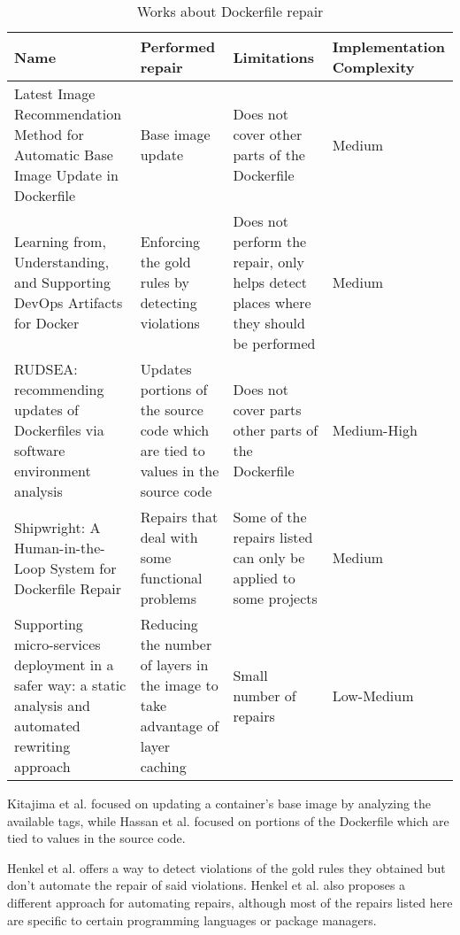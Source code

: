 \begin{table}[H]
    \centering
    \begin{tabular}{|p{}|p{}|p{}|p{}|}
        \hline \textbf{Name} & \textbf{Performed repair} & \textbf{Limitations} & \textbf{Implementation Complexity} \\
        \hline Latest Image Recommendation Method for Automatic Base Image Update in Dockerfile \cite{kitajimaLatestImageRecommendation2020} & Base image update & Does not cover other parts of the Dockerfile & Medium \\
        \hline Learning from, Understanding, and Supporting DevOps Artifacts for Docker \cite{henkelLearningUnderstandingSupporting2020} & Enforcing the gold rules by detecting violations & Does not perform the repair, only helps detect places where they should be performed & Medium \\
        \hline RUDSEA: recommending updates of Dockerfiles via software environment analysis \cite{hassanRUDSEARecommendingUpdates2018} & Updates portions of the source code which are tied to values in the source code & Does not cover parts other parts of the Dockerfile & Medium-High \\
        \hline Shipwright: A Human-in-the-Loop System for Dockerfile Repair \cite{henkelShipwrightHumanintheLoopSystem2021} & Repairs that deal with some functional problems & Some of the repairs listed can only be applied to some projects & Medium \\
        \hline Supporting micro-services deployment in a safer way: a static analysis and automated rewriting approach \cite{benniSupportingMicroservicesDeployment2018} & Reducing the number of layers in the image to take advantage of layer caching & Small number of repairs & Low-Medium \\
        \hline
    \end{tabular} 
    \caption{Works about Dockerfile repair}
    \label{tab:works_dockerfile_repair}
\end{table}

Kitajima et al. \cite{kitajimaLatestImageRecommendation2020} focused on updating a container's base image by analyzing the available tags, while Hassan et al. \cite{hassanRUDSEARecommendingUpdates2018} focused on portions of the Dockerfile which are tied to values in the source code.

Henkel et al. \cite{henkelLearningUnderstandingSupporting2020} offers a way to detect violations of the gold rules they obtained but don't automate the repair of said violations. Henkel et al. \cite{henkelShipwrightHumanintheLoopSystem2021} also proposes a different approach for automating repairs, although most of the repairs listed here are specific to certain programming languages or package managers.

